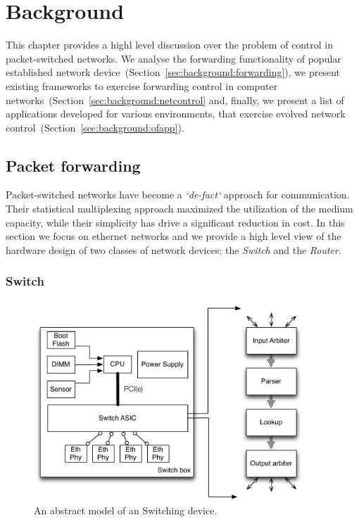 \chapter{Background} \label{ch:background}
\ifpdf
    \graphicspath{{Background/BackgroundFigs/PNG/}{Chapter3/BackgroundFigs/PDF/}{Background/BackgroundFigs/}}
\else
    \graphicspath{{Background/BackgroundFigs/EPS/}{Background/BackgroundFigs/}}
\fi

This chapter provides a highl level discussion over the problem of control in
packet-switched networks. We analyse the forwarding functionality of popular
established network device~(Section~\ref{sec:background:forwarding}), we present
existing frameworks to exercise forwarding control in computer
networks~(Section~\ref{sec:background:netcontrol} and, finally, we present a
list of applications developed for various environments, that exercise evolved
network control~(Section~\ref{sec:background:ofapp}).

\section{Packet forwarding} \label{sec:background:forwrding}

Packet-switched networks have become a \emph{`de-fact`} approach for
communication. Their statistical multiplexing approach maximized the utilization
of the medium capacity, while their simplicity has drive a significant reduction
in cost.  In this section we focus on ethernet networks and we provide a high
level view of the hardware design of two classes of network devices: the {\it
  Switch } and the {\it Router}. 

\subsection{Switch}

\begin{figure}
\includegraphics[width=0.9\textwidth]{switch_design}
\caption{An abstract model of an Switching device.}
\label{fig:background:switch_design}
\end{figure}

